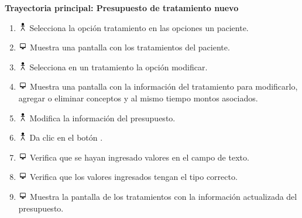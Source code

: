 \textbf{Trayectoria principal: Presupuesto de tratamiento nuevo}
\begin{enumerate}
\item \includegraphics[height=1em]{pictures/actor.png} Selecciona la opción tratamiento en las opciones un paciente.
\item \includegraphics[height=1em]{pictures/sistema.png} Muestra una pantalla con los tratamientos del paciente. 
\item \includegraphics[height=1em]{pictures/actor.png} Selecciona en un tratamiento la opción modificar.
\item \includegraphics[height=1em]{pictures/sistema.png} Muestra una pantalla con la información del tratamiento para modificarlo, agregar o eliminar conceptos y al mismo tiempo montos asociados.
\item \includegraphics[height=1em]{pictures/actor.png} Modifica la información del presupuesto.
\item \includegraphics[height=1em]{pictures/actor.png} Da clic en el botón .
\item \includegraphics[height=1em]{pictures/sistema.png} Verifica que se hayan ingresado valores en el campo de texto.
\item \includegraphics[height=1em]{pictures/sistema.png} Verifica que los valores ingresados tengan el tipo correcto.
\item \includegraphics[height=1em]{pictures/sistema.png} Muestra la pantalla de los tratamientos con la información actualizada del presupuesto.
\end{enumerate} \bigskip

